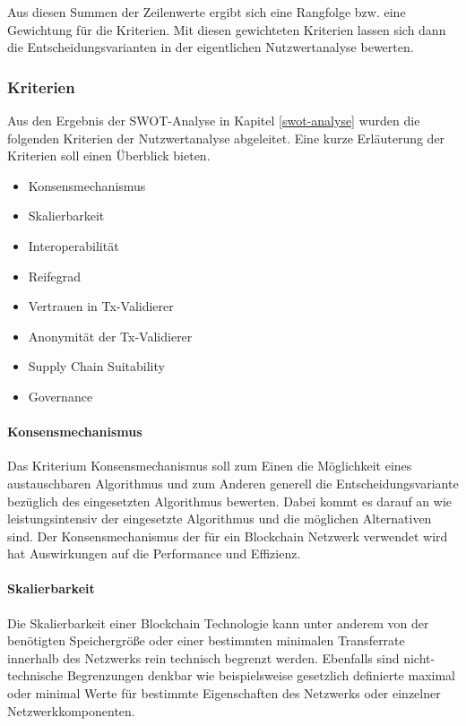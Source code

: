 Aus diesen Summen der Zeilenwerte ergibt sich eine Rangfolge bzw. eine Gewichtung für die Kriterien. Mit diesen gewichteten Kriterien lassen sich dann die Entscheidungsvarianten in der eigentlichen Nutzwertanalyse bewerten.

\subsubsection{Kriterien}
Aus den Ergebnis der SWOT-Analyse in Kapitel \ref{swot-analyse} wurden die folgenden Kriterien der Nutzwertanalyse abgeleitet. Eine kurze Erläuterung der Kriterien soll einen Überblick bieten.

\begin{itemize}
	\item Konsensmechanismus
	\item Skalierbarkeit
	\item Interoperabilität
	\item Reifegrad
	\item Vertrauen in Tx-Validierer
	\item Anonymität der Tx-Validierer
	\item Supply Chain Suitability
	\item Governance
\end{itemize}

\paragraph{Konsensmechanismus}
Das Kriterium Konsensmechanismus soll zum Einen die Möglichkeit eines austauschbaren Algorithmus und zum Anderen generell die Entscheidungsvariante bezüglich des eingesetzten Algorithmus bewerten. Dabei kommt es darauf an wie leistungsintensiv der eingesetzte Algorithmus und die möglichen Alternativen sind. Der Konsensmechanismus der für ein Blockchain Netzwerk verwendet wird hat Auswirkungen auf die Performance und Effizienz.

\paragraph{Skalierbarkeit}
Die Skalierbarkeit einer Blockchain Technologie kann unter anderem von der benötigten Speichergröße oder einer bestimmten minimalen Transferrate innerhalb des Netzwerks rein technisch begrenzt werden. Ebenfalls sind nicht-technische Begrenzungen denkbar wie beispielsweise gesetzlich definierte maximal oder minimal Werte für bestimmte Eigenschaften des Netzwerks oder einzelner Netzwerkkomponenten.

